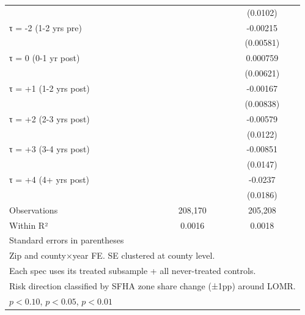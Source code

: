 \begin{table}[htbp]
\begin{tabular}{l*{2}{c}}
                    &                     &    (0.0102)         \\
[0.15em]
τ = -2 (1-2 yrs pre)&                     &    -0.00215         \\
                    &                     &   (0.00581)         \\
[0.15em]
τ = 0 (0-1 yr post) &                     &    0.000759         \\
                    &                     &   (0.00621)         \\
[0.15em]
τ = +1 (1-2 yrs post)&                     &    -0.00167         \\
                    &                     &   (0.00838)         \\
[0.15em]
τ = +2 (2-3 yrs post)&                     &    -0.00579         \\
                    &                     &    (0.0122)         \\
[0.15em]
τ = +3 (3-4 yrs post)&                     &    -0.00851         \\
                    &                     &    (0.0147)         \\
[0.15em]
τ = +4 (4+ yrs post)&                     &     -0.0237         \\
                    &                     &    (0.0186)         \\
\hline
Observations        &     208,170         &     205,208         \\
Within R²           &      0.0016         &      0.0018         \\
\hline\hline
\multicolumn{3}{l}{\footnotesize Standard errors in parentheses}\\
\multicolumn{3}{l}{\footnotesize Zip and county×year FE. SE clustered at county level.}\\
\multicolumn{3}{l}{\footnotesize Each spec uses its treated subsample + all never-treated controls.}\\
\multicolumn{3}{l}{\footnotesize Risk direction classified by SFHA zone share change (±1pp) around LOMR.}\\
\multicolumn{3}{l}{\footnotesize \sym{*} \(p<0.10\), \sym{**} \(p<0.05\), \sym{***} \(p<0.01\)}\\
\end{tabular}
\end{table}
